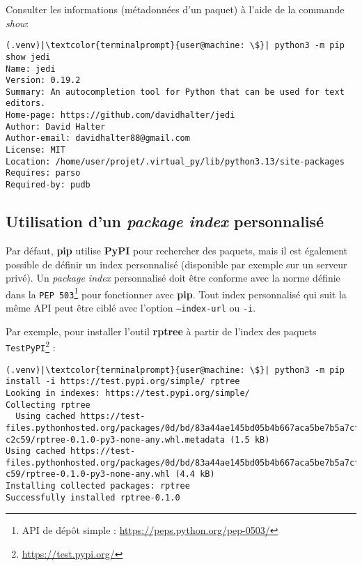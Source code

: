 Consulter les informations (métadonnées d'un paquet) à l'aide de la commande \textit{show}:
\begin{lstlisting}[style=terminal]
(.venv)|\textcolor{terminalprompt}{user@machine: \$}| python3 -m pip show jedi
Name: jedi
Version: 0.19.2
Summary: An autocompletion tool for Python that can be used for text editors.
Home-page: https://github.com/davidhalter/jedi
Author: David Halter
Author-email: davidhalter88@gmail.com
License: MIT
Location: /home/user/projet/.virtual_py/lib/python3.13/site-packages
Requires: parso
Required-by: pudb
\end{lstlisting}

\subsection*{Utilisation d’un \textit{package index} personnalisé}
Par défaut, \textbf{pip} utilise \textbf{PyPI} pour rechercher des paquets, mais il est également possible de définir un index personnalisé (disponible par exemple sur un serveur privé). Un \textit{package index} personnalisé doit être conforme avec la norme définie dans la \texttt{PEP 503}\footnote{API de dépôt simple : \url{https://peps.python.org/pep-0503/}} pour fonctionner avec \textbf{pip}. Tout index personnalisé qui suit la même API peut être ciblé avec l’option \texttt{--index-url} ou \texttt{-i}.

Par exemple, pour installer l’outil \textbf{rptree} à partir de l’index des paquets \texttt{TestPyPI}\footnote{\url{https://test.pypi.org/}} :
\begin{lstlisting}[style=terminal]
(.venv)|\textcolor{terminalprompt}{user@machine: \$}| python3 -m pip install -i https://test.pypi.org/simple/ rptree
Looking in indexes: https://test.pypi.org/simple/
Collecting rptree
  Using cached https://test-files.pythonhosted.org/packages/0d/bd/83a44ae145bd05b4b667aca5be7b5a7cf61d0d26577c0c93f2a2d0d c2c59/rptree-0.1.0-py3-none-any.whl.metadata (1.5 kB)
Using cached https://test-files.pythonhosted.org/packages/0d/bd/83a44ae145bd05b4b667aca5be7b5a7cf61d0d26577c0c93f2a2d0dc2 c59/rptree-0.1.0-py3-none-any.whl (4.4 kB)
Installing collected packages: rptree
Successfully installed rptree-0.1.0
\end{lstlisting}

